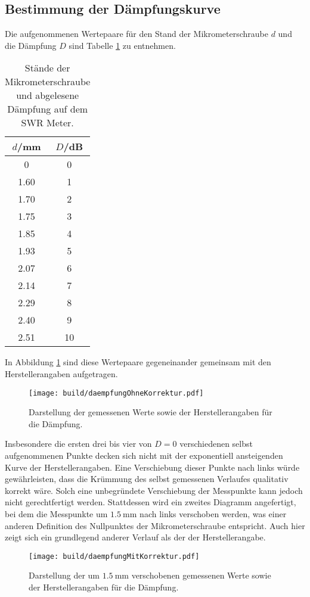 \subsection{Bestimmung der Dämpfungskurve}
\label{subsec:auswertungdämpfung}

Die aufgenommenen Wertepaare für den Stand der Mikrometerschraube $d$ und die Dämpfung $D$ sind Tabelle \ref{tab:daempfung} zu entnehmen.

\begin{table}
\centering
\caption{Stände der Mikrometerschraube und abgelesene Dämpfung auf dem SWR Meter.}
\label{tab:daempfung}
\begin{tabular}{c c}
\toprule
$d$/mm & $D$/dB \\
\midrule
  0    &  0 \tabularnewline
  1.60 &  1 \tabularnewline
  1.70 &  2 \tabularnewline
  1.75 &  3 \tabularnewline
  1.85 &  4 \tabularnewline
  1.93 &  5 \tabularnewline
  2.07 &  6 \tabularnewline
  2.14 &  7 \tabularnewline
  2.29 &  8 \tabularnewline
  2.40 &  9 \tabularnewline
  2.51 & 10 \tabularnewline
\bottomrule
\end{tabular}
\end{table}

In Abbildung \ref{fig:daempfungOhneKorrektur} sind diese Wertepaare gegeneinander gemeinsam mit den Herstellerangaben aufgetragen.

\begin{figure}
  \centering
  \texttt{[image: build/daempfungOhneKorrektur.pdf]}
  \caption{Darstellung der gemessenen Werte sowie der Herstellerangaben für die Dämpfung.}
  \label{fig:daempfungOhneKorrektur}
\end{figure}

Insbesondere die ersten drei bis vier von $D=0$ verschiedenen selbst aufgenommenen Punkte decken sich nicht mit der exponentiell ansteigenden Kurve der Herstellerangaben. Eine Verschiebung dieser Punkte nach links würde gewährleisten, dass die Krümmung des selbst gemessenen Verlaufes qualitativ korrekt wäre. Solch eine unbegründete Verschiebung der Messpunkte kann jedoch nicht gerechtfertigt werden. Stattdessen wird ein zweites Diagramm angefertigt, bei dem die Messpunkte um $\SI{1.5}{\milli\meter}$ nach links verschoben werden, was einer anderen Definition des Nullpunktes der Mikrometerschraube entspricht.
Auch hier zeigt sich ein grundlegend anderer Verlauf als der der Herstellerangabe.

\begin{figure}
  \centering
  \texttt{[image: build/daempfungMitKorrektur.pdf]}
  \caption{Darstellung der um $\SI{1.5}{\milli\meter}$ verschobenen gemessenen Werte sowie der Herstellerangaben für die Dämpfung.}
  \label{fig:daempfungMitKorrektur}
\end{figure}

